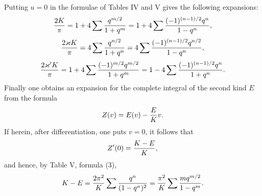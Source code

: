 \documentclass[11pt]{article}
\begin{document}
Putting $u=0$ in the formulae of Tables IV and V gives the following expansions:
\[
{2K\over\pi}=1+4\sum{q^{m/2}\over1+q^m}
=1+4\sum{(-1)^{(n-1)/2}q^n\over1-q^n},
\]
\[
{2\varkappa K\over\pi}=4\sum{q^{n/2}\over1+q^n}
=4\sum{(-1)^{(n-1)/2}q^{n/2}\over1-q^n},
\]
\[
{2\varkappa' K\over\pi}=1+4\sum{(-1)^{m/2}q^{m/2}\over1+q^m}
=1-4\sum{(-1)^{(n-1)/2}q^n\over1+q^n}.
\]
Finally one obtains an expansion for the complete integral of the second kind $E$ from the formula
\[
Z(v)=E(v)-{E\over K}v.
\]
If herein, after differentiation, one puts $v=0$, it follows that
\[
Z'(0)={K-E\over K},
\]
and hence, by Table V, formula (3),
\[
K-E={2\pi^2\over K}\sum {q^n\over(1-q^n)^2}
={\pi^2\over K}\sum {m q^{m/2}\over1-q^m}.
\]
\end{document}
